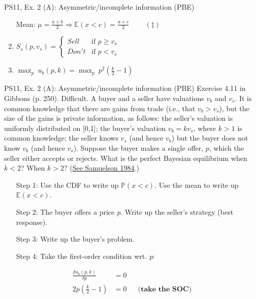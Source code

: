 \begin{frame}{PS11, Ex. 2 (A): Asymmetric/incomplete information (PBE)}
\begin{multicols}{2}
\begin{enumerate}
        \item[Mean:] $\mu=\frac{a+b}{2}\Rightarrow\mathbb{E}(x<c)=\frac{a+c}{2}\quad\quad\ (\ddagger)$
        \item $S_s(p,v_s)=\left\{\begin{array}{ll}
          Sell  & \text{if }p\geq v_s \\
          Don't & \text{if }p < v_s
        \end{array}\right.$
        \item $\displaystyle{\max_p}\ u_b(p,k)=\displaystyle{\max_p}\ p^2\left(\frac{k}{2}-1\right)$
      \end{enumerate}
      \vfill\null
    \end{multicols}
\end{frame}
\begin{frame}{PS11, Ex. 2 (A): Asymmetric/incomplete information (PBE)}
    Exercise 4.11 in Gibbons (p. 250). Difficult. A buyer and a seller have valuations $v_b$ and $v_s$. It is common knowledge that there are gains from trade (i.e., that $v_b > v_s$), but the size of the gains is private information, as follows: the seller’s valuation is uniformly distributed on [0,1]; the buyer’s valuation $v_b = kv_s$, where $k > 1$ is common knowledge; the seller knows $v_s$ (and hence $v_b$) but the buyer does not know $v_b$ (and hence $v_s$). Suppose the buyer makes a single offer, $p$, which the seller either accepts or rejects. What is the perfect Bayesian equilibrium when $k < 2$? When $k > 2$? (\href{https://www.jstor.org/stable/1911195}{See Samuelson 1984}.) \vspace{-8pt}
    \begin{multicols}{2}
      \begin{itemize}
        \item[Step 1:] Use the CDF to write up $\mathbb{P}(x<c)$. Use the mean to write up $\mathbb{E}(x<c)$.
        \item[Step 2:] The buyer offers a price \textit{p}. Write up the seller's strategy (best response).
        \item[Step 3:] Write up the buyer's problem.
        \item[Step 4:] Take the first-order condition wrt. \textit{p}:
      \end{itemize} \vspace{-8pt}
      \begin{align*}
        \frac{\delta u_b(p,k)}{\delta p}&=0\\
        2p\left(\frac{k}{2}-1\right)&=0&&\textbf{(take the SOC)}\\

\end{align*}
\end{multicols}
\end{frame}

